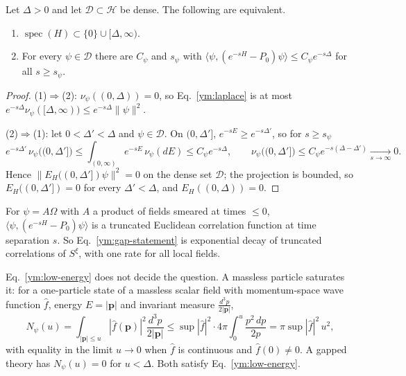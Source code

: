 \begin{proposition}\label{ym:prop:gap-decay}
Let $\Delta>0$ and let $\mathcal D\subset\mathcal H$ be dense. The following
are equivalent.
\begin{enumerate}
\item $\operatorname{spec}(H)\subset\{0\}\cup[\Delta,\infty)$.
\item For every $\psi\in\mathcal D$ there are $C_\psi$ and $s_\psi$ with
 $\langle\psi,(e^{-sH}-P_0)\psi\rangle\le C_\psi e^{-s\Delta}$ for all
 $s\ge s_\psi$.
\end{enumerate}
\end{proposition}
\begin{proof}
(1)$\Rightarrow$(2): $\nu_\psi((0,\Delta))=0$, so Eq.~\eqref{ym:laplace} is
at most $e^{-s\Delta}\nu_\psi([\Delta,\infty))\le e^{-s\Delta}\|\psi\|^2$.

(2)$\Rightarrow$(1): let $0<\Delta'<\Delta$ and $\psi\in\mathcal D$. On
$(0,\Delta']$, $e^{-sE}\ge e^{-s\Delta'}$, so for $s\ge s_\psi$
\begin{equation}
 e^{-s\Delta'}\,\nu_\psi\big((0,\Delta']\big)
 \le\int_{(0,\infty)}e^{-sE}\,\nu_\psi(dE)\le C_\psi e^{-s\Delta},
 \qquad
 \nu_\psi\big((0,\Delta']\big)\le C_\psi e^{-s(\Delta-\Delta')}
 \xrightarrow[s\to\infty]{}0 .
\end{equation}
Hence $\|E_H((0,\Delta'])\psi\|^2=0$ on the dense set $\mathcal D$; the
projection is bounded, so $E_H((0,\Delta'])=0$ for every $\Delta'<\Delta$,
and $E_H((0,\Delta))=0$.
\end{proof}
For $\psi=A\Omega$ with $A$ a product of fields smeared at times $\le0$,
$\langle\psi,(e^{-sH}-P_0)\psi\rangle$ is a truncated Euclidean correlation
function at time separation $s$. So Eq.~\eqref{ym:gap-statement} is
exponential decay of truncated correlations of $S^\xi$, with one rate for
all local fields.

Eq.~\eqref{ym:low-energy} does not decide the question. A massless particle
saturates it: for a one-particle state of a massless scalar field with
momentum-space wave function $\hat f$, energy $E=|\mathbf p|$ and invariant
measure $\frac{d^3p}{2|\mathbf p|}$,
\begin{equation}\label{ym:massless-rate}
 N_\psi(u)=\int_{|\mathbf p|\le u}|\hat f(\mathbf p)|^2
 \frac{d^3p}{2|\mathbf p|}
 \le\sup|\hat f|^2\cdot4\pi\int_0^u\frac{p^2\,dp}{2p}
 =\pi\sup|\hat f|^2\,u^2 ,
\end{equation}
with equality in the limit $u\to0$ when $\hat f$ is continuous and
$\hat f(0)\ne0$. A gapped theory has $N_\psi(u)=0$ for $u<\Delta$. Both
satisfy Eq.~\eqref{ym:low-energy}.

